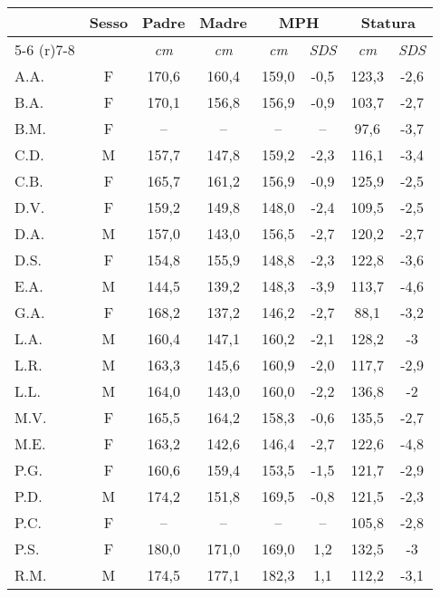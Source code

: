 \begin{table}[!h]
\begin{center}
\begin{tabular}{lccccccc}
\toprule
 & \multirow{2}{*}{Sesso} & 
   \multirow{2}{*}{Padre} & 
   \multirow{2}{*}{Madre} & 
   \multicolumn{2}{c}{MPH} &
   \multicolumn{2}{c}{Statura} \\
 \cmidrule(r){5-6} \cmidrule(r){7-8}
 & & \emph{cm} & \emph{cm} & \emph{cm} & \emph{SDS}  &		\emph{cm}	& \emph{SDS}             	 \\

\midrule
A.A.	& F & 170,6 & 160,4 & 159,0 & -0,5 	 		& 123,3 & -2,6  \\
B.A.	& F & 170,1 & 156,8 & 156,9 & -0,9   			& 103,7 & -2,7   \\
B.M.	& F & --    & --    & --    & --     			&  97,6 & -3,7  \\
C.D.	& M & 157,7 & 147,8 & 159,2 & -2,3 	        	& 116,1 & -3,4  \\
C.B.	& F & 165,7 & 161,2 & 156,9 & -0,9 	 	        & 125,9 & -2,5  \\
D.V.	& F & 159,2 & 149,8 & 148,0 & -2,4   			& 109,5 & -2,5   \\
D.A.	& M & 157,0 & 143,0 & 156,5 & -2,7 	  		& 120,2 & -2,7  \\
D.S.	& F & 154,8 & 155,9 & 148,8 & -2,3   			& 122,8 & -3,6  \\
E.A.	& M & 144,5 & 139,2 & 148,3 & -3,9 	  		& 113,7 & -4,6  \\
G.A.	& F & 168,2 & 137,2 & 146,2 & -2,7 	  		&  88,1 & -3,2  \\
L.A.	& M & 160,4 & 147,1 & 160,2 & -2,1   			& 128,2 & -3    \\
L.R.	& M & 163,3 & 145,6 & 160,9 & -2,0 	  		& 117,7 & -2,9  \\
L.L.	& M & 164,0 & 143,0 & 160,0 & -2,2 	  		& 136,8 & -2     \\
M.V.	& F & 165,5 & 164,2 & 158,3 & -0,6   			& 135,5 & -2,7  \\
M.E.	& F & 163,2 & 142,6 & 146,4 & -2,7 	  		& 122,6 & -4,8  \\
P.G.	& F & 160,6 & 159,4 & 153,5 & -1,5   			& 121,7 & -2,9  \\
P.D.	& M & 174,2 & 151,8 & 169,5 & -0,8 	  		& 121,5 & -2,3  \\
P.C.	& F & --    & --    & --    & --   	  		& 105,8 & -2,8   \\
P.S.	& F & 180,0 & 171,0 & 169,0 & 1,2  	  		& 132,5 & -3    \\
R.M.	& M & 174,5 & 177,1 & 182,3 & 1,1    			& 112,2 & -3,1  \\

\end{tabular}
\end{center}
\end{table}
